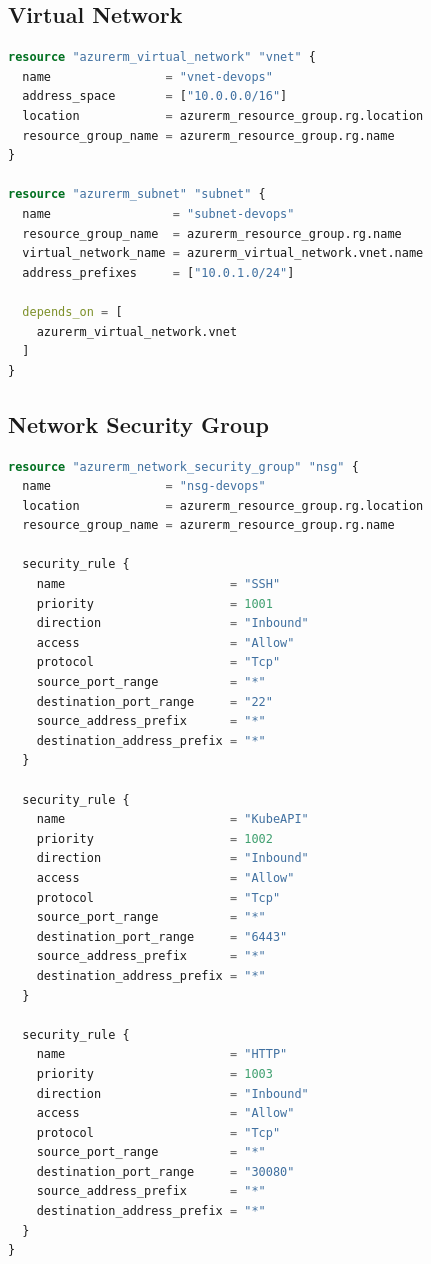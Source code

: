 \documentclass[12pt,a4paper,twoside]{report}
\begin{document}
\subsection{Virtual Network}

\begin{lstlisting}[language=terraform]
resource "azurerm_virtual_network" "vnet" {
  name                = "vnet-devops"
  address_space       = ["10.0.0.0/16"]
  location            = azurerm_resource_group.rg.location
  resource_group_name = azurerm_resource_group.rg.name
}

resource "azurerm_subnet" "subnet" {
  name                 = "subnet-devops"
  resource_group_name  = azurerm_resource_group.rg.name
  virtual_network_name = azurerm_virtual_network.vnet.name
  address_prefixes     = ["10.0.1.0/24"]

  depends_on = [
    azurerm_virtual_network.vnet
  ]
}
\end{lstlisting}

\subsection{Network Security Group}

\begin{lstlisting}[language=terraform]
resource "azurerm_network_security_group" "nsg" {
  name                = "nsg-devops"
  location            = azurerm_resource_group.rg.location
  resource_group_name = azurerm_resource_group.rg.name

  security_rule {
    name                       = "SSH"
    priority                   = 1001
    direction                  = "Inbound"
    access                     = "Allow"
    protocol                   = "Tcp"
    source_port_range          = "*"
    destination_port_range     = "22"
    source_address_prefix      = "*"
    destination_address_prefix = "*"
  }

  security_rule {
    name                       = "KubeAPI"
    priority                   = 1002
    direction                  = "Inbound"
    access                     = "Allow"
    protocol                   = "Tcp"
    source_port_range          = "*"
    destination_port_range     = "6443"
    source_address_prefix      = "*"
    destination_address_prefix = "*"
  }

  security_rule {
    name                       = "HTTP"
    priority                   = 1003
    direction                  = "Inbound"
    access                     = "Allow"
    protocol                   = "Tcp"
    source_port_range          = "*"
    destination_port_range     = "30080"
    source_address_prefix      = "*"
    destination_address_prefix = "*"
  }
}
\end{lstlisting}
\end{document}
